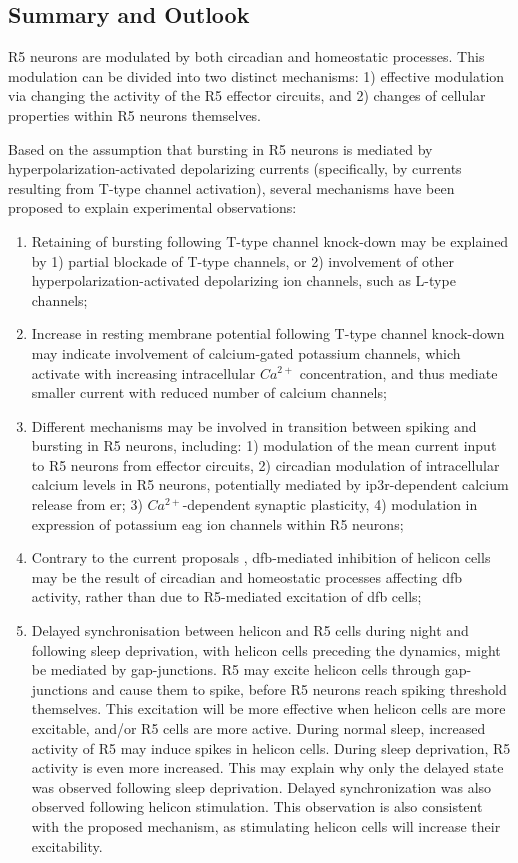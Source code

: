 \documentclass[../main.tex]{subfiles}
\begin{document}
\subsection{Summary and Outlook}

R5 neurons are modulated by both circadian and homeostatic processes. This modulation can be divided into two distinct mechanisms: 1) effective modulation via changing the activity of the R5 effector circuits, and 2) changes of cellular properties within R5 neurons themselves.

Based on the assumption that bursting in R5 neurons is mediated by hyperpolarization-activated depolarizing currents (specifically, by currents resulting from T-type channel activation), several mechanisms have been proposed to explain experimental observations:
\begin{enumerate}
    \item Retaining of bursting following T-type channel knock-down may be explained by 1) partial blockade of T-type channels, or 2) involvement of other hyperpolarization-activated depolarizing ion channels, such as L-type channels;
    \item Increase in resting membrane potential following T-type channel knock-down may indicate involvement of calcium-gated potassium channels, which activate with increasing intracellular $Ca^{2+}$ concentration, and thus mediate smaller current with reduced number of calcium channels;
    \item Different mechanisms may be involved in transition between spiking and bursting in R5 neurons, including: 1) modulation of the mean current input to R5 neurons from effector circuits, 2) circadian modulation of intracellular calcium levels in R5 neurons, potentially mediated by \gls{ip3r}-dependent calcium release from \gls{er}; 3) $Ca^{2+}$-dependent synaptic plasticity, 4) modulation in expression of potassium \gls{eag} ion channels within R5 neurons;
    \item Contrary to the current proposals \cite{raccugliaCoherentMultilevelNetwork2022,krummSlowlyOscillatingBrain2021}, \gls{dfb}-mediated inhibition of helicon cells may be the result of circadian and homeostatic processes affecting \gls{dfb} activity, rather than due to R5-mediated excitation of \gls{dfb} cells;
    \item Delayed synchronisation between helicon and R5 cells during night and following sleep deprivation, with helicon cells preceding the dynamics, might be mediated by gap-junctions.
    R5 may excite helicon cells through gap-junctions and cause them to spike, before R5 neurons reach spiking threshold themselves. This excitation will be more effective when helicon cells are more excitable, and/or R5 cells are more active. During normal sleep, increased activity of R5 may induce spikes in helicon cells. During sleep deprivation, R5 activity is even more increased. This may explain why only the delayed state was observed following sleep deprivation.
    Delayed synchronization was also observed following helicon stimulation. This observation is also consistent with the proposed mechanism, as stimulating helicon cells will increase their excitability.
\end{enumerate}
\end{document}
